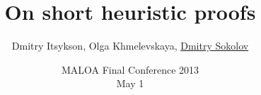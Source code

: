 

\title[\insertframenumber/\inserttotalframenumber~|~
On short heuristic proofs]{On short heuristic proofs}
\author[Sokolov D.O]{Dmitry Itsykson, Olga Khmelevskaya, \underline{Dmitry Sokolov}}

\date{MALOA Final Conference 2013\\
	May 1}



	\maketitle

	



